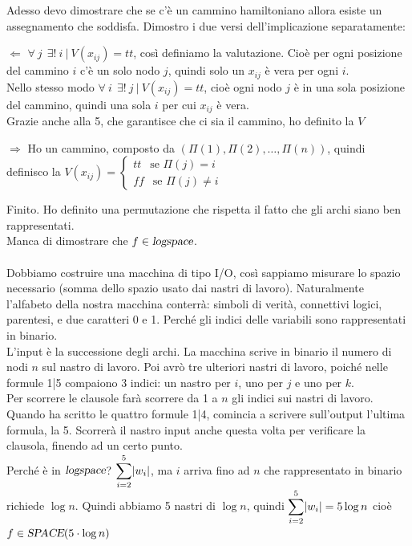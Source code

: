 \documentclass[10pt]{book}
\begin{document}
Adesso devo dimostrare che se c'è un cammino hamiltoniano allora esiste un assegnamento che soddisfa. Dimostro i due versi dell'implicazione separatamente:
\begin{list}{}{}
	\item[$\Leftarrow$] $\forall\:j\:\:\exists!\:i\:|\:V(x_{ij}) = tt$, così definiamo la valutazione. Cioè per ogni posizione del cammino $i$ c'è un solo nodo $j$, quindi solo un $x_{ij}$ è vera per ogni $i$.\\
	Nello stesso modo $\forall\:i\:\:\exists!\:j\:|\:V(x_{ij}) = tt$, cioè ogni nodo $j$ è in una sola posizione del cammino, quindi una sola $i$ per cui $x_{ij}$ è vera.\\
	Grazie anche alla 5, che garantisce che ci sia il cammino, ho definito la $V$
	\item[$\Rightarrow$] Ho un cammino, composto da $(\Pi(1), \Pi(2), \ldots, \Pi(n))$, quindi definisco la $V(x_{ij}) = \left\{\begin{array}{l}
	tt\:\:\text{ se }\Pi(j) = i\\
	ff\:\:\text{ se }\Pi(j) \neq i
\end{array}	 \right.$
\end{list}
Finito. Ho definito una permutazione che rispetta il fatto che gli archi siano ben rappresentati.\\Manca di dimostrare che $f \in \textsl{logspace}$.
\pagebreak
\paragraph{} Dobbiamo costruire una macchina di tipo I/O, così sappiamo misurare lo spazio necessario (somma dello spazio usato dai nastri di lavoro). Naturalmente l'alfabeto della nostra macchina conterrà: simboli di verità, connettivi logici, parentesi, e due caratteri 0 e 1. Perché gli indici delle variabili sono rappresentati in binario.\\
L'input è la successione degli archi. La macchina scrive in binario il numero di nodi $n$ sul nastro di lavoro. Poi avrò tre ulteriori nastri di lavoro, poiché nelle formule 1|5 compaiono 3 indici: un nastro per $i$, uno per $j$ e uno per $k$.\\
Per scorrere le clausole farà scorrere da 1 a $n$ gli indici sui nastri di lavoro. Quando ha scritto le quattro formule 1|4, comincia a scrivere sull'output l'ultima formula, la 5. Scorrerà il nastro input anche questa volta per verificare la clausola, finendo ad un certo punto.\\
Perché è in $\textsl{logspace}$? $\mathlarger{\sum_{i=2}^5} |w_i|$, ma $i$ arriva fino ad $n$ che rappresentato in binario richiede $\log n$. Quindi abbiamo 5 nastri di $\log n$, quindi $\mathlarger{\sum_{i=2}^5} |w_i| = 5\log n$ cioè $f\in \textsl{SPACE}(5\cdot\log n)$
\end{document}
